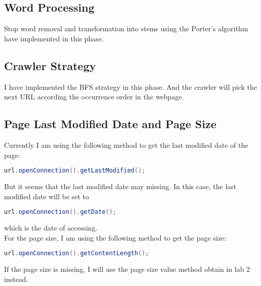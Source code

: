 \documentclass{article}
\begin{document}
        \subsection*{Word Processing}
            Stop word removal and transformation into stems using the Porter's algorithm have implemented in this phase.
        \subsection*{Crawler Strategy}
            I have implemented the BFS strategy in this phase. And the crawler will pick the next URL according the occurrence order in the webpage.
        \subsection*{Page Last Modified Date and Page Size}
            Currently I am using the following method to get the last modified date of the page:
            \begin{lstlisting}[language=Java]
                url.openConnection().getLastModified();
            \end{lstlisting}
            But it seems that the last modified date may missing. In this case, the last modified date will be set to 
            \begin{lstlisting}[language=Java]
                url.openConnection().getDate();
            \end{lstlisting}
            which is the date of accessing. \\[0.4em]
            For the page size, I am using the following method to get the page size:
            \begin{lstlisting}[language=Java]
                url.openConnection().getContentLength();
            \end{lstlisting}
            If the page size is missing, I will use the page size value method obtain in lab 2 instead.
        
            
\end{document}
